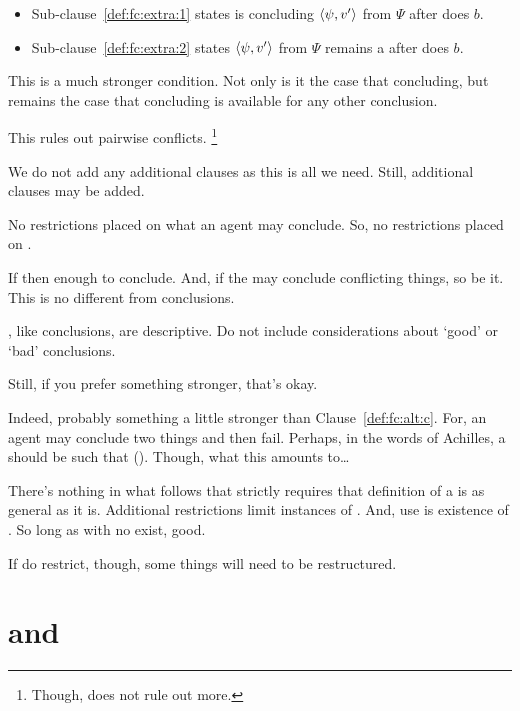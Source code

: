\begin{note}
  \begin{itemize}[noitemsep]
  \item
    Sub-clause~\ref{def:fc:extra:1} states \vAgent{} is concluding \(\langle \psi, v' \rangle\) from \(\Psi\) after \vAgent{} does \(b\).
  \item
    Sub-clause~\ref{def:fc:extra:2} states \vAgent{} \(\langle \psi, v' \rangle\) from \(\Psi\) remains a \fc{} after \vAgent{} does \(b\).
  \end{itemize}

  \noindent This is a much stronger condition.
  Not only is it the case that concluding, but remains the case that concluding is available for any other conclusion.

  This rules out pairwise conflicts.%
  \footnote{
    Though, does not rule out more.
  }

  We do not add any additional clauses as this is all we need.
  Still, additional clauses may be added.

  No restrictions placed on what an agent may conclude.
  So, no restrictions placed on .

  If \fc{} then enough to conclude.
  And, if the may conclude conflicting things, so be it.
  This is no different from conclusions.

  , like conclusions, are descriptive.
  Do not include considerations about `good' or `bad' conclusions.
\end{note}

\begin{note}
  Still, if you prefer something stronger, that's okay.

  Indeed, probably something a little stronger than Clause~\autoref{def:fc:alt:c}.
  For, an agent may conclude two things and then fail.
  Perhaps, in the words of Achilles, a \fc{} should be such that  (\cite[280]{Carroll:1895uj}).
  Though, what this amounts to\dots

  There's nothing in what follows that strictly requires that definition of a \fc{} is as general as it is.
  Additional restrictions limit instances of .
  And, use is existence of .
  So long as  with no \wit{} exist, good.

  If do restrict, though, some things will need to be restructured.
\end{note}

\section{ and }
\label{cha:fcs:support}

